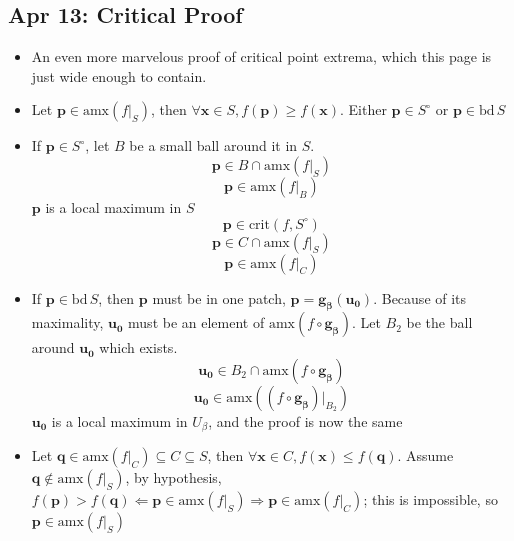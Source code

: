 \documentclass[10pt, oneside]{article}
\let\leq\leqslant
\let\geq\geqslant
\renewcommand{\vec}[1]{\mathbf{#1}}
\newcommand{\vecf}[1]{\boldsymbol{#1}}
\begin{document}
\subsection{Apr 13: Critical Proof}
\begin{itemize}
    \item An even more marvelous proof of critical point extrema, which this page is just wide enough to contain.
    \item Let $\vec{p} \in \text{amx}(f|_S)$, then $\forall \vec{x} \in S, f(\vec{p}) \geq f(\vec{x})$. Either $\vec{p} \in S^\circ$ or $\vec{p} \in \text{bd} \, S$
    \item If $\vec{p} \in S^\circ$, let $B$ be a small ball around it in $S$.   
            \[\vec{p} \in B \cap \text{amx}(f|_S)\]
            \[\vec{p} \in \text{amx}(f|_B)\]
        $\vec{p}$ is a local maximum in $S$
            \[\vec{p} \in \text{crit}(f,S^\circ)\]
            \[\vec{p} \in C \cap \text{amx}(f|_S)\]
            \[\vec{p} \in \text{amx}(f|_C)\]
    \item If $\vec{p} \in \text{bd} \, S$, then $\vec{p}$ must be in one patch, $\vec{p} = \vecf{g_\beta}(\vec{u_0})$. Because of its maximality, $\vec{u_0}$ must be an element of $\text{amx}(f \circ \vecf{g_\beta})$. Let $B_2$ be the ball around $\vec{u_0}$ which exists. 
            \[\vec{u_0} \in B_2 \cap \text{amx}(f \circ \vecf{g_\beta})\]
            \[\vec{u_0} \in \text{amx}((f \circ \vecf{g_\beta})|_{B_2})\]
        $\vec{u_0}$ is a local maximum in $U_\beta$, and the proof is now the same
    \item Let $\vec{q} \in \text{amx}(f|_C) \subseteq C \subseteq S$, then $\forall \vec{x} \in C, f(\vec{x}) \leq f(\vec{q})$. Assume $\vec{q} \notin \text{amx}(f|_S)$, by hypothesis, $f(\vec{p}) > f(\vec{q}) \Leftarrow \vec{p} \in \text{amx}(f|_S) \Rightarrow \vec{p} \in \text{amx}(f|_C)$; this is impossible, so $\vec{p} \in \text{amx}(f|_S)$
\end{itemize}
\end{document}
